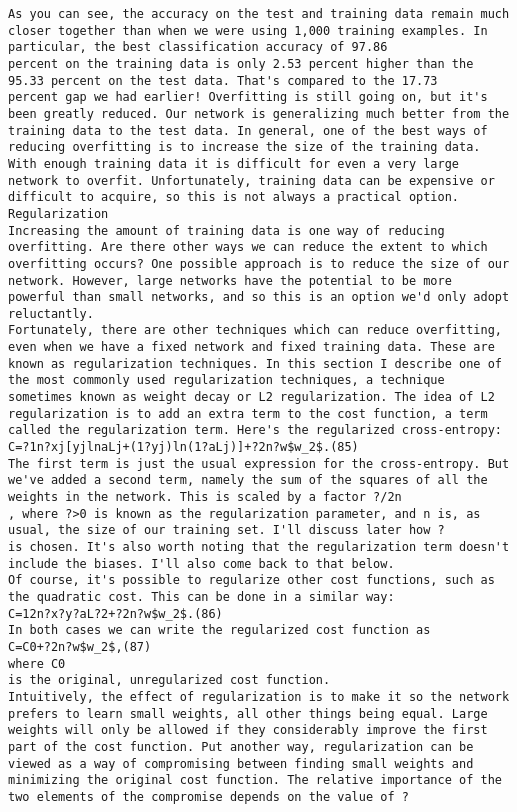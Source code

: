 \begin{lstlisting}
As you can see, the accuracy on the test and training data remain much closer together than when we were using 1,000 training examples. In particular, the best classification accuracy of 97.86
percent on the training data is only 2.53 percent higher than the 95.33 percent on the test data. That's compared to the 17.73
percent gap we had earlier! Overfitting is still going on, but it's been greatly reduced. Our network is generalizing much better from the training data to the test data. In general, one of the best ways of reducing overfitting is to increase the size of the training data. With enough training data it is difficult for even a very large network to overfit. Unfortunately, training data can be expensive or difficult to acquire, so this is not always a practical option.
Regularization
Increasing the amount of training data is one way of reducing overfitting. Are there other ways we can reduce the extent to which overfitting occurs? One possible approach is to reduce the size of our network. However, large networks have the potential to be more powerful than small networks, and so this is an option we'd only adopt reluctantly.
Fortunately, there are other techniques which can reduce overfitting, even when we have a fixed network and fixed training data. These are known as regularization techniques. In this section I describe one of the most commonly used regularization techniques, a technique sometimes known as weight decay or L2 regularization. The idea of L2 regularization is to add an extra term to the cost function, a term called the regularization term. Here's the regularized cross-entropy:
C=?1n?xj[yjlnaLj+(1?yj)ln(1?aLj)]+?2n?w$w_2$.(85)
The first term is just the usual expression for the cross-entropy. But we've added a second term, namely the sum of the squares of all the weights in the network. This is scaled by a factor ?/2n
, where ?>0 is known as the regularization parameter, and n is, as usual, the size of our training set. I'll discuss later how ?
is chosen. It's also worth noting that the regularization term doesn't include the biases. I'll also come back to that below.
Of course, it's possible to regularize other cost functions, such as the quadratic cost. This can be done in a similar way:
C=12n?x?y?aL?2+?2n?w$w_2$.(86)
In both cases we can write the regularized cost function as 
C=C0+?2n?w$w_2$,(87)
where C0
is the original, unregularized cost function.
Intuitively, the effect of regularization is to make it so the network prefers to learn small weights, all other things being equal. Large weights will only be allowed if they considerably improve the first part of the cost function. Put another way, regularization can be viewed as a way of compromising between finding small weights and minimizing the original cost function. The relative importance of the two elements of the compromise depends on the value of ?

\end{lstlisting}
